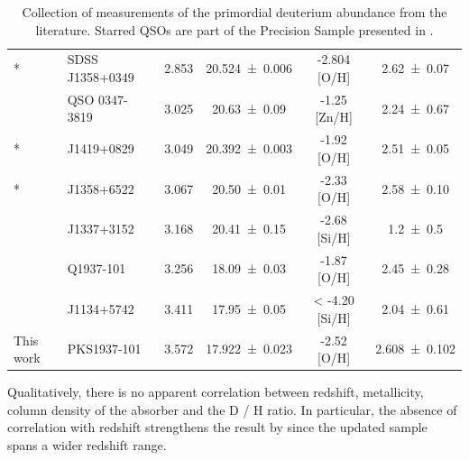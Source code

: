 \documentclass[fleqn,usenatbib]{mnras}
\makeatletter
\DeclareRobustCommand{\ion}[2]{%
  \mbox{#1\check@mathfonts\fontsize\sf@size\z@\selectfont #2}%
}
\makeatother
\begin{document}
\begin{table}
\begin{tabular}{l|l|c|c|c|c}
         \citet{cooke_16}*              & SDSS J1358+0349 & 2.853  & \num{20.524 \pm 0.006}   & -2.804 [O/H]   & \num{2.62 \pm 0.07} \\
         \citet{dodorico_01}            & QSO 0347-3819   & 3.025  & \num{20.63  \pm 0.09}    & -1.25 [Zn/H]   & \num{2.24 \pm 0.67} \\
         \citet{pettini_2012}*          & J1419+0829      & 3.049  & \num{20.392 \pm 0.003}   & -1.92 [O/H]    & \num{2.51 \pm 0.05} \\
         \citet{cooke_14}*              & J1358+6522      & 3.067  & \num{20.50  \pm 0.01}    & -2.33 [O/H]    & \num{2.58 \pm 0.10} \\
         \citet{Srianand_10}            & J1337+3152      & 3.168  & \num{20.41  \pm 0.15}    & -2.68 [Si/H]   & \num{1.2  \pm 0.5} \\
         \citet{RS_15}                  & Q1937-101       & 3.256  & \num{18.09  \pm 0.03}    & -1.87 [O/H]    & \num{2.45 \pm 0.28} \\
         \citet{fumagalli_2011}         & J1134+5742      & 3.411  & \num{17.95  \pm 0.05}    & < -4.20 [Si/H] & \num{2.04 \pm 0.61} \\
         This work                      & PKS1937-101       & 3.572  & \num{17.922 \pm 0.023}   & -2.52 [O/H]  & \num{2.608 \pm 0.102} \\
         \bottomrule
    \end{tabular}
    \caption{Collection of measurements of the primordial deuterium abundance from the literature. Starred QSOs are part of the Precision Sample presented in \citet{cooke_18}.}
    \label{tab:otherDeuterium}
\end{table}

Qualitatively, there is no apparent correlation between redshift, metallicity, column density of the absorber and the \ion{D}{}/\ion{H}{} ratio. In particular, the absence of correlation with redshift strengthens the result by \citet{cooke_18} since the updated sample spans a wider redshift range. 
\end{document}
